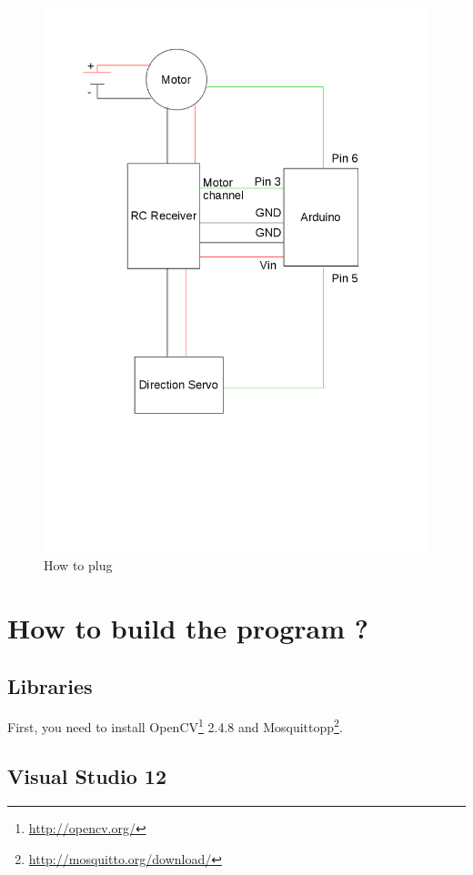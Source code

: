 \documentclass[a4paper,11pt]{report}
\begin{document}
\begin{figure}[!ht]
\centering
\includegraphics[scale=0.5]{img_static/wires}
\caption{How to plug}
\label{fig:wires}
\end{figure}

\section{How to build the program ?}

\subsection{Libraries}

First, you need to install OpenCV\footnote{\url{http://opencv.org/}} 2.4.8 and
Mosquittopp\footnote{\url{http://mosquitto.org/download/}}.

\subsection{Visual Studio 12}
\end{document}
